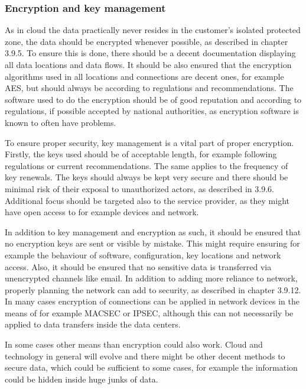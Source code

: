 \documentclass{article}
\begin{document}
\subsubsection{Encryption and key management} %
As in cloud the data practically never resides in the customer's isolated protected zone, the data should be encrypted whenever possible, as described in chapter 3.9.5. To ensure this is done, there should be a decent documentation displaying all data locations and data flows. It should be also ensured that the encryption algorithms used in all locations and connections are decent ones, for example AES, but should always be according to regulations and recommendations. The software used to do the encryption should be of good reputation and according to regulations, if possible accepted by national authorities, as encryption software is known to often have problems.
\par
To ensure proper security, key management is a vital part of proper encryption. Firstly, the keys used should be of acceptable length, for example following regulations or current recommendations. The same applies to the frequency of key renewals. The keys should always be kept very secure and there should be minimal risk of their exposal to unauthorized actors, as described in 3.9.6. Additional focus should be targeted also to the service provider, as they might have open access to for example devices and network.
\par
In addition to key management and encryption as such, it should be ensured that no encryption keys are sent or visible by mistake. This might require ensuring for example the behaviour of software, configuration, key locations and network access. Also, it should be ensured that no sensitive data is transferred via unencrypted channels like email. In addition to adding more reliance to network, properly planning the network can add to security, as described in chapter 3.9.12. In many cases encryption of connections can be applied in network devices in the means of for example MACSEC or IPSEC, although this can not necessarily be applied to data transfers inside the data centers.
\par
In some cases other means than encryption could also work. Cloud and technology in general will evolve and there might be other decent methods to secure data, which could be sufficient to some cases, for example the information could be hidden inside huge junks of data.
\end{document}
